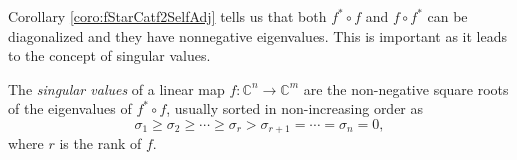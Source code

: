 \begin{rem}
  Corollary \ref{coro:fStarCatf2SelfAdj} tells us that both $f^*\circ f$ and $f\circ f^*$
  can be diagonalized and they have nonnegative eigenvalues.
  This is important 
  as it leads to the concept of singular values.
\end{rem}

\begin{defn}
  \label{def:singularValues}
  The \emph{singular values} of a linear map
  $f: \mathbb{C}^n\rightarrow \mathbb{C}^m$
  are the non-negative square roots of the eigenvalues
  of $f^*\circ f$,  %
  usually sorted in non-increasing order as 
  \begin{displaymath}
    \sigma_1 \ge \sigma_2 \ge \cdots \ge \sigma_r
    > \sigma_{r+1} = \cdots = \sigma_n = 0, 
  \end{displaymath}
  where $r$ is the rank of $f$.
\end{defn}

